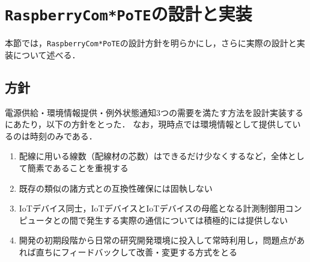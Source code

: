 

\section{{\tt Raspberry\-Com*PoTE}の設計と実装}
\label{sec:04design_and_implementation}

本節では，{\tt Raspberry\-Com*PoTE}の設計方針を明らかにし，さらに実際の設計と実装について述べる．


\subsection{方針}

電源供給・環境情報提供・例外状態通知3つの需要を満たす方法を設計実装するにあたり，以下の方針をとった．
なお，現時点では環境情報として提供しているのは時刻のみである．

\begin{enumerate}
\item 配線に用いる線数（配線材の芯数）はできるだけ少なくするなど，全体として簡素であることを重視する
\item 既存の類似の諸方式との互換性確保には固執しない
\item IoTデバイス同士，IoTデバイスとIoTデバイスの母艦となる計測制御用コンピュータとの間で発生する実際の通信については積極的には提供しない
\item 開発の初期段階から日常の研究開発環境に投入して常時利用し，問題点があれば直ちにフィードバックして改善・変更する方式をとる
\end{enumerate}

